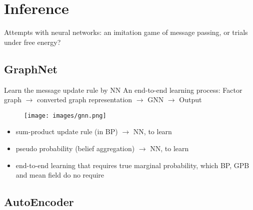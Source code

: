 \section{Inference}

{ 
  \begin{frame}
    \begin{center}
      {\large Attempts with neural networks: an imitation game of message passing, or trials under free energy?}
    \end{center}
    
  \end{frame}
}
\subsection{GraphNet}

\begin{frame}{Learn the message update rule by NN}
  An end-to-end learning process: Factor graph $\rightarrow$ converted graph representation $\rightarrow$ GNN $\rightarrow$ Output
  \begin{figure}
    \centerline{\texttt{[image: images/gnn.png]}}
  \end{figure}
  \begin{itemize}[label=$\bullet$]
  \item sum-product update rule (in BP) $\rightarrow$ NN, to learn
  \item pseudo probability (belief aggregation) $\rightarrow$ NN, to learn
  \item end-to-end learning that requires true marginal probability, which BP, GPB and mean field do no require
  \end{itemize}
  \let\thefootnote\relax{}
\end{frame}

\subsection{AutoEncoder}

